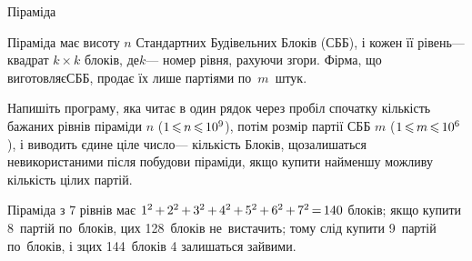 \begin{problemAllDefault}{Піраміда}

Піраміда має висоту $n$ Стандартних Будівельних Блоків (СББ), і кожен її рівень\nolinebreak[3] --- квадрат $k{\times}k$ блоків, де\nolinebreak[3] $k$\nolinebreak[3] --- номер рівня, рахуючи згори. Фірма, що виготовляє\nolinebreak[3] СББ, продає їх лише партіями по~$m$~штук.

{

Напишіть програму, яка читає в один рядок через пробіл спочатку кількість бажаних рівнів піраміди $n$ ($1\,{\leqslant}\,n\,{\leqslant}\,10^9$), потім розмір партії СББ $m$ ($1\,{\leqslant}\,m\,{\leqslant}\,10^6$), і виводить єдине ціле число\nolinebreak[3] --- кількість Блоків, що\nolinebreak[3] залишаться не\nolinebreak[3] використаними після побудови піраміди, якщо купити найменшу можливу кількість цілих партій.

}

\myflfigaw{\hspace*{-0.5em}\begin{exampleSimple}{2em}{3em}%

\end{exampleSimple}\hspace*{-0.25em}}

\Note
Піраміда з 7 рівнів має $1^2\dib{{+}}2^2\dib{{+}}3^2\dib{{+}}4^2\dib{{+}}5^2\dib{{+}}6^2\dib{{+}}7^2\dib{{=}}140$ 
блоків; якщо купити 8~партій по~блоків, цих 128~блоків не~вистачить; тому слід купити 9~партій по~блоків, і з\nolinebreak[3] цих 144~блоків 4 залишаться зайвими.


\end{problemAllDefault}
